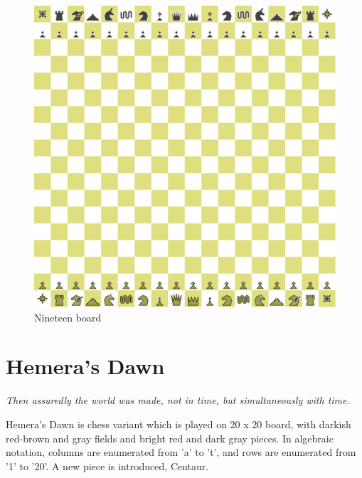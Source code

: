 \documentclass[a5paper,12pt,draft]{book} %
\begin{document}
\noindent
\begin{figure}[h]
\includegraphics[width=1.0\textwidth, keepaspectratio=true]{../gfx/boards/12_nineteen.png}
\caption{Nineteen board}
\label{fig:nineteen}
\end{figure}

\clearpage

\chapter*{Hemera's Dawn}

\begin{flushright}
\parbox{0.8\textwidth}{
\emph{Then assuredly the world was made, not in time, but simultaneously with time. \\
 } }
\end{flushright}

\noindent
Hemera's Dawn is chess variant which is played on 20 x 20 board, with
darkish red-brown and gray fields and bright red and dark gray pieces.
In algebraic notation, columns are enumerated from 'a' to 't', and rows
are enumerated from '1' to '20'. A new piece is introduced, Centaur.
\end{document}
